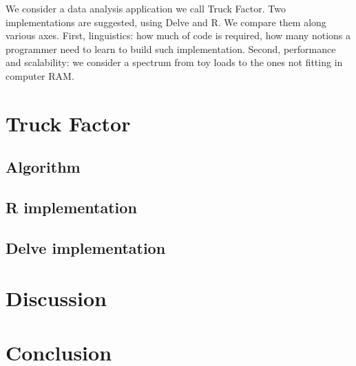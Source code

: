 We consider a data analysis application we call Truck Factor.
Two implementations are suggested, using Delve and R. We compare them
along various axes. First, linguistics: how much of code is required,
how many notions a programmer need to learn to build such implementation.
Second, performance and scalability: we consider a spectrum from 
toy loads to the ones not fitting in computer RAM.



\section{Truck Factor}

\subsection{Algorithm}

\subsection{R implementation}

\subsection{Delve implementation}

\section {Discussion}

\section{Conclusion}

